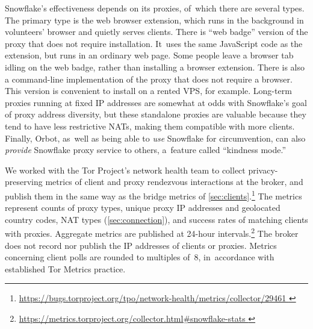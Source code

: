 \documentclass[letterpaper,twocolumn]{article}
\newlength{\urlfootnotesize}
\newcommand{\urlfootnote}[1]{\footnote{
\raggedright\hangindent\footnotemargin%
\fontsize{\urlfootnotesize}{\urlfootnotesize}\selectfont%
\url{#1}
}}
\begin{document}
Snowflake's effectiveness depends on its proxies,
of~which there are several types.
The primary type is the web browser extension,
which runs in the background in volunteers' browser
and quietly serves clients.
There is ``web badge'' version of the proxy that does not require installation.
It~uses the same JavaScript code as the extension, but runs in an ordinary web page.
Some people leave a browser tab idling on the web badge,
rather than installing a browser extension.
There is also a command-line implementation of the proxy
that does not require a browser.
This version is convenient to install on a rented VPS, for example.
Long-term proxies running at fixed IP addresses
are somewhat at odds with Snowflake's goal of proxy address diversity,
but these standalone proxies are valuable because
they tend to have less restrictive NATs,
making them compatible with more clients.
Finally, Orbot,
as~well as being able to \emph{use} Snowflake for circumvention,
can also \emph{provide} Snowflake proxy service to others,
a~feature called ``kindness mode.''

We worked with the Tor Project's network health team to collect privacy-preserving metrics
of client and proxy rendezvous interactions at the broker,
and publish them in the same way as the bridge metrics of \autoref{sec:clients}.\urlfootnote{
https://bugs.torproject.org/tpo/network-health/metrics/collector/29461
}
The metrics represent counts of proxy types,
unique proxy IP addresses and geolocated country codes,
NAT types (\autoref{sec:connection}), and
success rates of matching clients with proxies.
Aggregate metrics
are published at 24-hour intervals.\urlfootnote{
https://metrics.torproject.org/collector.html\#snowflake-stats
}
The broker does not record nor publish the IP addresses
of clients or proxies.
Metrics concerning client polls are rounded to multiples of~8,
in~accordance with established Tor Metrics practice.
\end{document}

